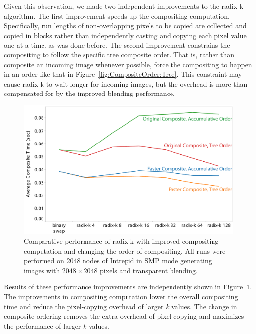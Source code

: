 \documentclass{sig-alternate}
\begin{document}
Given this observation, we made two independent improvements to the radix-k
algorithm.  The first improvement speeds-up the compositing computation.
Specifically, run lengths of non-overlapping pixels to be copied are
collected and copied in blocks rather than independently casting and
copying each pixel value one at a time, as was done before.  The second
improvement constrains the compositing to follow the specific tree
composite order.  That is, rather than composite an incoming image whenever
possible, force the compositing to happen in an order like that in
Figure~\ref{fig:CompositeOrder:Tree}.  This constraint may cause radix-k to
wait longer for incoming images, but the overhead is more than compensated
for by the improved blending performance.

\begin{figure}[htbp]
  \centering
    \includegraphics[width=.97\linewidth]{images/CompositeImprovements2048}
  \caption{Comparative performance of radix-k with improved compositing
    computation and changing the order of compositing.  All runs were
    performed on 2048 nodes of Intrepid in SMP mode generating images with
    $2048 \times 2048$ pixels and transparent blending.}
  \label{fig:IceTCompositeImprovements}
\end{figure}

Results of these performance improvements are independently shown in
Figure~\ref{fig:IceTCompositeImprovements}.  The improvements in compositing
computation lower the overall compositing time and reduce the pixel-copying
overhead of larger $k$ values.  The change in composite ordering removes
the extra overhead of pixel-copying and maximizes the performance of larger
$k$ values.
\end{document}
